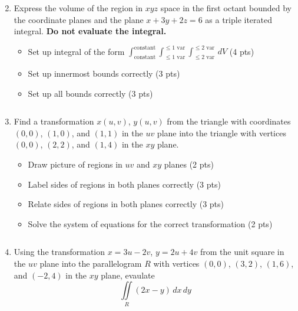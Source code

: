 \documentclass[12pt]{article}
\newcommand{\up}{$~$\vspace*{-0.7in}}
\newcommand{\liner}{\noindent\underline{\hspace*{7in}}}
\begin{document}
\begin{enumerate}
\vspace*{8in}

\liner

\newpage\up


\item Express the volume of the region in $xyz$ space in the first octant bounded by  the coordinate planes and the plane $x+3y+2z=6$ as a triple iterated integral. \textbf{Do not evaluate the integral.}

  \begin{itemize}
  \item Set up integral of the form $\int_{\text{constant}}^{\text{constant}}\int_{\leq 1\text{ var}}^{\leq 1\text{ var}}\int_{\leq 2\text{ var}}^{\leq 2\text{ var}} \, dV$ (4 pts)
  \item Set up innermost bounds correctly (3 pts)
  \item Set up all bounds correctly (3 pts)
  \end{itemize}

\vspace*{8in}

\liner

\newpage\up


\item Find a transformation $x(u,v)$, $y(u,v)$ from the triangle with coordinates $(0,0)$, $(1,0)$, and $(1,1)$ in the $uv$ plane into the triangle with vertices $(0,0)$, $(2,2)$, and $(1,4)$ in the $xy$ plane.

  \begin{itemize}
  \item Draw picture of regions in $uv$ and $xy$ planes (2 pts)
  \item Label sides of regions in both planes correctly (3 pts)
  \item Relate sides of regions in both planes correctly (3 pts)
  \item Solve the system of equations for the correct transformation (2 pts)
  \end{itemize}

\vspace*{7in}

\liner

\newpage\up


\item Using the transformation $x=3u-2v$, $y=2u+4v$ from the unit square in the $uv$ plane into the parallelogram $R$ with vertices $(0,0)$, $(3,2)$, $(1,6)$, and $(-2,4)$ in the $xy$ plane, evaulate \[\iint\limits_{R} \left(2x-y\right) \,dx\,dy\]


\end{enumerate}
\end{document}
